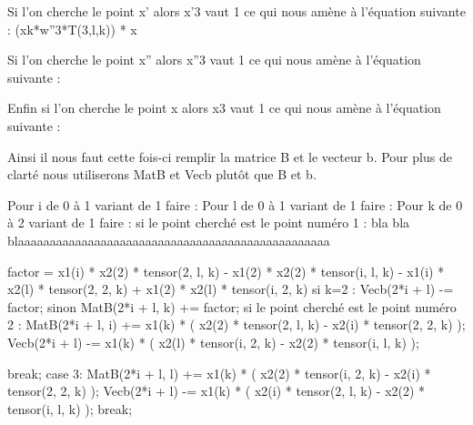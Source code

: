 \documentclass[a4paper,10pt]{report}
\begin{document}
Si l’on cherche le point x’ alors x’3 vaut 1 ce qui nous amène à l’équation suivante :
(xk*w”3*T(3,l,k)) * x

Si l’on cherche le point x” alors x”3 vaut 1 ce qui nous amène à l’équation suivante :


Enfin si l’on cherche le point x alors x3 vaut 1 ce qui nous amène à l’équation suivante :

Ainsi il nous faut cette fois-ci remplir la matrice B et le vecteur b. Pour plus de clarté nous utiliserons MatB et Vecb plutôt que B et b.

Pour i de 0 à 1 variant de 1 faire :
  Pour l de 0 à 1 variant de 1 faire :
     Pour k de 0 à 2 variant de 1 faire :
        si le point cherché est le point numéro 1 :
bla bla blaaaaaaaaaaaaaaaaaaaaaaaaaaaaaaaaaaaaaaaaaaaaaaaaa

           factor = x1(i) * x2(2) * tensor(2, l, k) - x1(2) * x2(2) * tensor(i, l, k) - x1(i) * x2(l) * tensor(2, 2, k) + x1(2) * x2(l) * tensor(i, 2, k)
           si k=2 :
              Vecb(2*i + l) -= factor;
           sinon
              MatB(2*i + l, k) += factor;
             si le point cherché est le point numéro 2 :
              MatB(2*i + l, i) += x1(k) * ( x2(2) * tensor(2, l, k) - x2(i) * tensor(2, 2, k) );
               Vecb(2*i + l) -= x1(k) * ( x2(l) * tensor(i, 2, k) - x2(2) * tensor(i, l, k) );

           
                               break;
             case 3:
               MatB(2*i + l, l) += x1(k) * ( x2(2) * tensor(i, 2, k) - x2(i) * tensor(2, 2, k) );
               Vecb(2*i + l) -= x1(k) * ( x2(i) * tensor(2, l, k) - x2(2) * tensor(i, l, k) );
               break;
\end{document}
